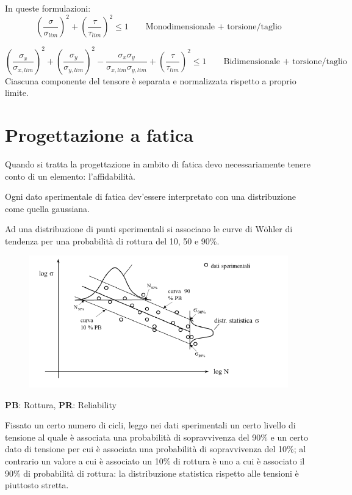 			In queste formulazioni:
			\[\left(\dfrac{\sigma}{\sigma_{lim}}\right)^2 + \left(\dfrac{\tau}{\tau_{lim}}\right)^2\leq1 \qquad \text{Monodimensionale + torsione/taglio}\]
			
			\[\left(\dfrac{\sigma_x}{\sigma_{x,lim}}\right)^2 + \left(\dfrac{\sigma_y}{\sigma_{y,lim}}\right)^2 - \dfrac{\sigma_x\sigma_y}{\sigma_{x,lim}\sigma_{y,lim}} + \left(\dfrac{\tau}{\tau_{lim}}\right)^2\leq1 \qquad \text{Bidimensionale + torsione/taglio}\]
			Ciascuna componente del tensore è separata e normalizzata rispetto a proprio limite. \newpage
			
\section{Progettazione a fatica}						
			Quando si tratta la progettazione in ambito di fatica devo necessariamente tenere conto di un elemento: l'affidabilità. 
			
			Ogni dato sperimentale di fatica dev'essere interpretato con una distribuzione come quella gaussiana.
			
			Ad una distribuzione di punti sperimentali si associano le curve di Wöhler di tendenza per una probabilità di rottura del 10, 50 e 90\%. 
\begin{figure}[H]
	\centering
	\label{fig:screenshot014}
	\includegraphics[width=0.7\linewidth]{immagini_11/screenshot014}
\end{figure}
			\textbf{PB}: Rottura, \textbf{PR}: Reliability
			
			Fissato un certo numero di cicli, leggo nei dati sperimentali un certo livello di tensione al quale è associata una probabilità di sopravvivenza del 90\% e un certo dato di tensione per cui è associata una probabilità di sopravvivenza del 10\%; al contrario un valore a cui è associato un 10\% di rottura è uno a cui è associato il 90\% di probabilità di rottura: la distribuzione statistica rispetto alle tensioni è piuttosto stretta. \newline 
			
